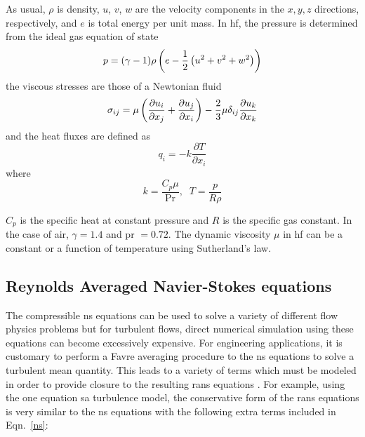 As usual, $\rho$ is density, $u$, $v$, $w$ are the velocity components in the $x, y, z$ directions, respectively, and $e$ is total energy per unit mass. In \gls{hf}, the pressure is determined from the ideal gas equation of state
\begin{equation}
p = (\gamma - 1)\rho\left(e - \frac{1}{2}\left(u^2 + v^2 + w^2\right)\right)
\end{equation}
the viscous stresses are those of a Newtonian fluid
\begin{equation}\label{sigma}
\sigma_{ij} = \mu\left( \frac{\partial u_i}{\partial x_j}
+ \frac{\partial u_j}{\partial x_i} \right)
- \frac{2}{3}\mu \delta_{ij}\frac{\partial u_k}{\partial x_k}
\end{equation}
and the heat fluxes are defined as
\begin{equation}
q_i = -k \frac{\partial T}{\partial x_i}
\end{equation}
where
\begin{equation}
k = \frac{C_p \mu}{\text{Pr}} , \;\; T = \frac{p}{R \rho}
\end{equation}

$C_p$ is the specific heat at constant pressure and $R$ is the specific gas constant. In the case of air, $\gamma = 1.4$ and \gls{pr} $= 0.72$. The dynamic viscosity $\mu$ in \gls{hf} can be a constant or a function of temperature using Sutherland's law.

\subsection{Reynolds Averaged Navier-Stokes equations}

The compressible \gls{ns} equations can be used to solve a variety of different flow physics problems but for turbulent flows, direct numerical simulation using these equations can become excessively expensive. For engineering applications, it is customary to perform a Favre averaging procedure to the \gls{ns} equations to solve a turbulent mean quantity. 
This leads to a variety of terms which must be modeled in order to provide closure to the resulting \gls{rans} equations \cite{wilcox1998turbulence,oliver2008high}. For example, using the one equation \gls{sa} turbulence model, the conservative form of the \gls{rans} equations is very similar to the \gls{ns} equations with the following extra terms included in Eqn.~\ref{ns}:

